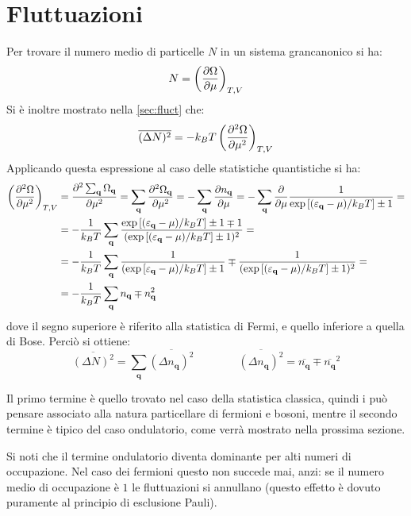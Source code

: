 
\section{Fluttuazioni}
\label{sec:quantumfluct}

Per trovare il numero medio di particelle $ N $ in un sistema grancanonico si ha:
\[ N = \left(\frac{\partial {\Omega}}{\partial {\mu}}\right)_{T,V} \]
Si è inoltre mostrato nella \cref{sec:fluct} che:
\[ \overline{(\Delta N)^2} = -k_B T \left(\frac{\partial {^2 \Omega}}{\partial {\mu^2}}\right)_{T,V} \]
Applicando questa espressione al caso delle statistiche quantistiche si ha:
\begin{align*}
\left(\frac{\partial {^2 \Omega}}{\partial {\mu^2}}\right)_{T,V} &= \frac{\partial {^2 \sum_{\textbf{q}} \Omega_{\textbf{q}}}}{\partial {\mu^2}} = \sum_{\textbf{q}} \frac{\partial {^2 \Omega_{\textbf{q}}}}{\partial {\mu^2}} = - \sum_{\textbf{q}} \frac{\partial {n_{\textbf{q}}}}{\partial {\mu}} = - \sum_{\textbf{q}} \frac{\partial {}}{\partial {\mu}}  \frac{1}{\exp\left[(\varepsilon_{\textbf{q}} - \mu)/k_B T\right] \pm 1} =\\
&= - \frac{1}{k_B T} \sum_{\textbf{q}}  \frac{\exp\left[(\varepsilon_{\textbf{q}} - \mu)/k_B T\right] \pm 1 \mp 1}{(\exp\left[(\varepsilon_{\textbf{q}} - \mu)/k_B T\right] \pm 1)^2} =\\
& = - \frac{1}{k_B T} \sum_{\textbf{q}}  \frac{1}{(\exp\left[\varepsilon_{\textbf{q}} - \mu)/k_B T\right] \pm 1} \mp \frac{1}{(\exp\left[(\varepsilon_{\textbf{q}} - \mu)/k_B T\right] \pm 1)^2} =\\
&= - \frac{1}{k_B T} \sum_{\textbf{q}} n_{\textbf{q}} \mp n_{\textbf{q}}^2
\end{align*}
dove il segno superiore è riferito alla statistica di Fermi, e quello inferiore a quella di Bose. Perciò si ottiene:
\[ \overline{(\Delta N)^2} = \sum_{\textbf{q}} \overline{(\Delta n_{\textbf{q}})^2} \qquad \qquad  \overline{(\Delta n_{\textbf{q}})^2} = \overline{n_{\textbf{q}}} \mp \overline{n_{\textbf{q}}}^2 \]

Il primo termine è quello trovato nel caso della statistica classica, quindi i può pensare associato alla natura particellare di fermioni e bosoni, mentre il secondo termine è tipico del caso ondulatorio, come verrà mostrato nella prossima sezione.

Si noti che il termine ondulatorio diventa dominante per alti numeri di occupazione. Nel caso dei fermioni questo non succede mai, anzi: se il numero medio di occupazione è $ 1 $ le fluttuazioni si annullano (questo effetto è dovuto puramente al principio di esclusione Pauli).


